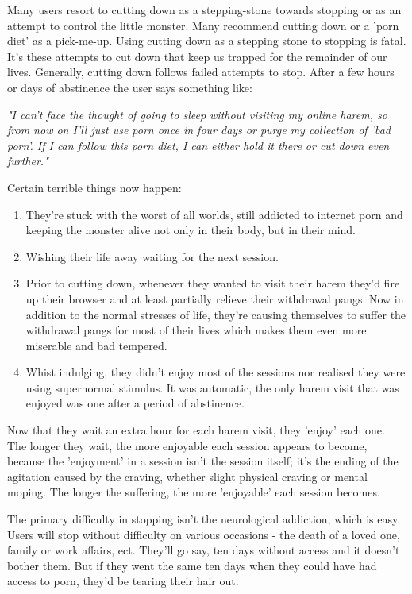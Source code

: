 \documentclass[easypeasy.tex]{subfiles}
\begin{document}
Many users resort to cutting down as a stepping-stone towards stopping or as an attempt to control the little monster. Many recommend cutting down or a 'porn diet' as a pick-me-up. Using cutting down as a stepping stone to stopping is fatal. It's these attempts to cut down that keep us trapped for the remainder of our lives. Generally, cutting down follows failed attempts to stop. After a few hours or days of abstinence the user says something like:

  \textit{"I can't face the thought of going to sleep without visiting my online harem, so from now on I'll just use porn once in four days or purge my collection of 'bad porn'. If I can follow this porn diet, I can either hold it there or cut down even further."}

Certain terrible things now happen:

 \begin{enumerate} 
  \item They're stuck with the worst of all worlds, still addicted to internet porn and keeping the monster alive not only in their body, but in their mind.

  \item Wishing their life away waiting for the next session.

  \item Prior to cutting down, whenever they wanted to visit their harem they'd fire up their browser and at least partially relieve their withdrawal pangs. Now in addition to the normal stresses of life, they're causing themselves to suffer the withdrawal pangs for most of their lives which makes them even more miserable and bad tempered.

  \item Whist indulging, they didn't enjoy most of the sessions nor realised they were using supernormal stimulus. It was automatic, the only harem visit that was enjoyed was one after a period of abstinence.

\end{enumerate}
Now that they wait an extra hour for each harem visit, they 'enjoy' each one. The longer they wait, the more enjoyable each session appears to become, because the 'enjoyment' in a session isn't the session itself; it's the ending of the agitation caused by the craving, whether slight physical craving or mental moping. The longer the suffering, the more 'enjoyable' each session becomes.

The primary difficulty in stopping isn't the neurological addiction, which is easy. Users will stop without difficulty on various occasions - the death of a loved one, family or work affairs, ect. They'll go say, ten days without access and it doesn't bother them. But if they went the same ten days when they could have had access to porn, they'd be tearing their hair out.
\end{document}

